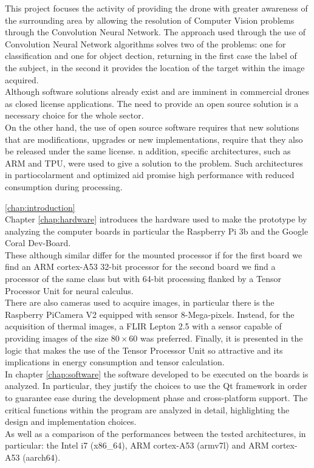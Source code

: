 \noindent This project focuses the activity of providing the drone with greater 
awareness of the surrounding area by allowing the resolution of Computer Vision
problems through the Convolution Neural Network.
The approach used through the use of Convolution Neural Network algorithms
solves two of the problems: one for classification and one for object dection,
returning in the first case the label of the subject, in the second it provides
the location of the target within the image acquired.\\
Although software solutions already exist and are imminent in commercial drones
as closed license applications. The need to provide an open source solution is a
necessary choice for the whole sector.\\
On the other hand, the use of open source software requires that new solutions
that are modifications, upgrades or new implementations, require that they also
be released under the same license. 
n addition, specific architectures, such as ARM and TPU, were used to give a
solution to the problem. Such architectures in partiocolarment and optimized aid
promise high performance with reduced consumption during processing.



\ref{chap:introduction}\\


\noindent Chapter \ref{chap:hardware} introduces the hardware used to make the
prototype by analyzing the computer boards in particular the Raspberry Pi 3b and
the Google Coral Dev-Board.\\
These although similar differ for the mounted processor if for the first board
we find an ARM cortex-A53 32-bit processor for the second board we find a
processor of the same class but with 64-bit processing flanked by a Tensor
Processor Unit for neural calculus.\\
There are also cameras used to acquire images, in particular there is the
Raspberry PiCamera V2 equipped with sensor 8-Mega-pixels. 
Instead, for the acquisition of thermal images, a FLIR Lepton 2.5 with a sensor
capable of providing images of the size $ 80 \times 60 $ was preferred. 
Finally, it is presented in the logic that makes the use of the Tensor Processor
Unit so attractive and its implications in energy consumption and tensor
calculation.\\

\noindent In chapter \ref{chap:software} the software developed to be executed
on the boards is analyzed. 
In particular, they justify the choices to use the Qt framework in
order to guarantee ease during the development phase and cross-platform support.
The critical functions within the program are analyzed in detail, highlighting
the design and implementation choices.\\ 
As well as a comparison of the performances between the tested architectures, in
particular: the Intel i7 (x86\_64), ARM cortex-A53 (armv7l) and ARM cortex-A53
(aarch64).\\


